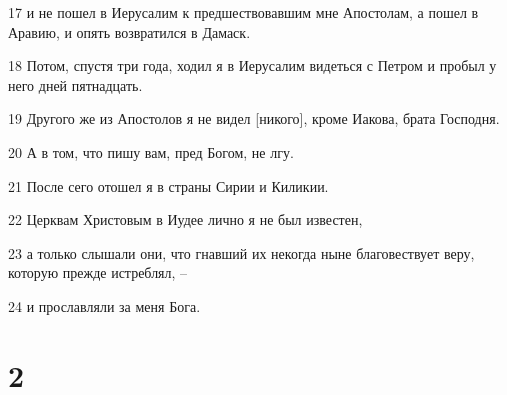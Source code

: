 \par 17 и не пошел в Иерусалим к предшествовавшим мне Апостолам, а пошел в Аравию, и опять возвратился в Дамаск.
\par 18 Потом, спустя три года, ходил я в Иерусалим видеться с Петром и пробыл у него дней пятнадцать.
\par 19 Другого же из Апостолов я не видел [никого], кроме Иакова, брата Господня.
\par 20 А в том, что пишу вам, пред Богом, не лгу.
\par 21 После сего отошел я в страны Сирии и Киликии.
\par 22 Церквам Христовым в Иудее лично я не был известен,
\par 23 а только слышали они, что гнавший их некогда ныне благовествует веру, которую прежде истреблял, --
\par 24 и прославляли за меня Бога.

\chapter{2}

